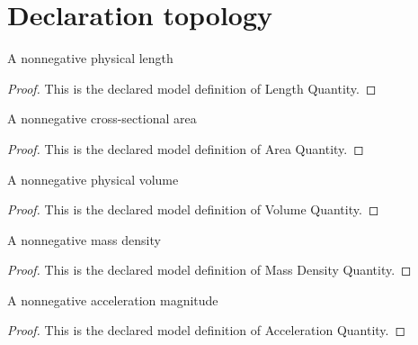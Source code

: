 \section{Declaration topology}
\begin{definition}
  \label{def:physics:phyx-mini-0334:phyxminiproblems-problemphyxmini0334-lengthquantity}
  A nonnegative physical length
\end{definition}
\begin{proof}
  This is the declared model definition of Length Quantity.
\end{proof}
\begin{definition}
  \label{def:physics:phyx-mini-0334:phyxminiproblems-problemphyxmini0334-areaquantity}
  A nonnegative cross-sectional area
\end{definition}
\begin{proof}
  This is the declared model definition of Area Quantity.
\end{proof}
\begin{definition}
  \label{def:physics:phyx-mini-0334:phyxminiproblems-problemphyxmini0334-volumequantity}
  A nonnegative physical volume
\end{definition}
\begin{proof}
  This is the declared model definition of Volume Quantity.
\end{proof}
\begin{definition}
  \label{def:physics:phyx-mini-0334:phyxminiproblems-problemphyxmini0334-massdensityquantity}
  A nonnegative mass density
\end{definition}
\begin{proof}
  This is the declared model definition of Mass Density Quantity.
\end{proof}
\begin{definition}
  \label{def:physics:phyx-mini-0334:phyxminiproblems-problemphyxmini0334-accelerationquantity}
  A nonnegative acceleration magnitude
\end{definition}
\begin{proof}
  This is the declared model definition of Acceleration Quantity.
\end{proof}
